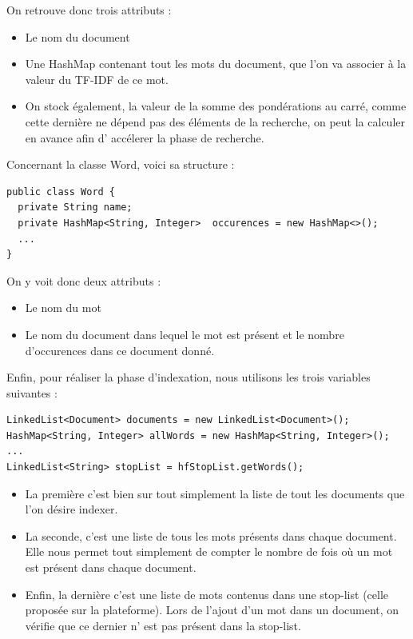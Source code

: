 \documentclass{article}
\begin{document}
On retrouve donc trois attributs :
\begin{itemize}
  \item Le nom du document
  \item Une HashMap contenant tout les mots du document, que l'on va associer à la valeur du
  TF-IDF de ce mot.
  \item On stock également, la valeur de la somme des pondérations au carré, comme cette
  dernière ne dépend pas des éléments de la recherche, on peut la calculer en avance afin d'
  accélerer la phase de recherche.
\end{itemize}

Concernant la classe Word, voici sa structure :

\begin{lstlisting}
public class Word {
  private String name;
  private HashMap<String, Integer>  occurences = new HashMap<>();
  ...
}
\end{lstlisting}

On y voit donc deux attributs :
\begin{itemize}
  \item Le nom du mot
  \item Le nom du document dans lequel le mot est présent et le nombre d'occurences dans ce
  document donné.
\end{itemize}

Enfin, pour réaliser la phase d'indexation, nous utilisons les trois variables suivantes :

\begin{lstlisting}
LinkedList<Document> documents = new LinkedList<Document>();
HashMap<String, Integer> allWords = new HashMap<String, Integer>();
...
LinkedList<String> stopList = hfStopList.getWords();
\end{lstlisting}

\begin{itemize}
  \item La première c'est bien sur tout simplement la liste de tout les documents que l'on
  désire indexer.
  \item La seconde, c'est une liste de tous les mots présents dans chaque document. Elle nous
  permet tout simplement de compter le nombre de fois où un mot est présent dans chaque
  document.
  \item Enfin, la dernière c'est une liste de mots contenus dans une stop-list (celle proposée
  sur la plateforme). Lors de l'ajout d'un mot dans un document, on vérifie que ce dernier n'
  est pas présent dans la stop-list.
\end{itemize}
\end{document}
